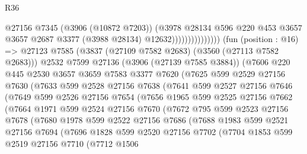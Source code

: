 \begin{lexlean}{R36}
\begin{coremodule}
                                @27156
                                @7345
                                (@3906 (@10872 @7203))
                                (@3978
                                  @28134
                                  @596
                                  @220
                                  @453
                                  @3657
                                  @3657
                                  @2687
                                  @3377
                                  (@3988 @28134)
                                  @12632)))))))))))))))
    (fun (position : @16) =>
    @27123
      @7585
      (@3837 (@27109 @7582 @2683) (@3560 (@27113 @7582 @2683)))
      @2532
      @7599
      @27136
      (@3906 (@27139 @7585 @3884))
      (@7606
        @220
        @445
        @2530
        @3657
        @3659
        @7583
        @3377
        @7620
        (@7625
          @599
          @2529
          @27156
          @7630
          (@7633
            @599
            @2528
            @27156
            @7638
            (@7641
              @599
              @2527
              @27156
              @7646
              (@7649
                @599
                @2526
                @27156
                @7654
                (@7656
                  @1965
                  @599
                  @2525
                  @27156
                  @7662
                  (@7664
                    @1971
                    @599
                    @2524
                    @27156
                    @7670
                    (@7672
                      @795
                      @599
                      @2523
                      @27156
                      @7678
                      (@7680
                        @1978
                        @599
                        @2522
                        @27156
                        @7686
                        (@7688
                          @1983
                          @599
                          @2521
                          @27156
                          @7694
                          (@7696
                            @1828
                            @599
                            @2520
                            @27156
                            @7702
                            (@7704
                              @1853
                              @599
                              @2519
                              @27156
                              @7710
                              (@7712
                                @1506

\end{coremodule}
\end{lexlean}
